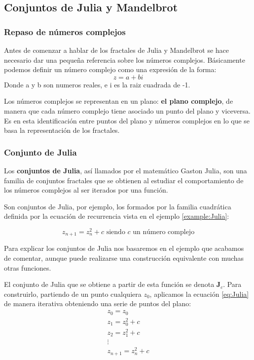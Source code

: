 \subsection{Conjuntos de Julia y Mandelbrot}

\subsubsection{Repaso de números complejos}
Antes de comenzar a hablar de los fractales de Julia y Mandelbrot se hace necesario dar una pequeña referencia sobre los números complejos. Básicamente podemos definir un número complejo como una expresión de la forma:
\[z=a +bi\]
Donde a y b son numeros reales, e i es la raiz cuadrada de -1.

Los números complejos se representan en un plano: \textbf{el plano complejo}, de manera que cada número complejo tiene asociado un punto del plano y viceversa. Es en esta identificación entre puntos del plano y números complejos en lo que se basa la representación de los fractales.

\subsubsection{Conjunto de Julia}
\begin{definition}
Los \textbf{conjuntos de Julia}, así llamados por el matemático Gaston Julia, son una familia de conjuntos fractales que se obtienen al estudiar el comportamiento de los números complejos al ser iterados por una función.

Son conjuntos de Julia, por ejemplo, los formados por la familia cuadrática definida por la ecuación de recurrencia vista en el ejemplo \ref{example:Julia}:

\begin{equation}
z_{n+1} = z_n^2+c \text{ siendo } c \text{ un número complejo}
\end{equation}\label{eq:Julia}

\end{definition}

Para explicar los conjuntos de Julia nos basaremos en el ejemplo que acabamos de comentar, aunque puede realizarse una construcción equivalente con muchas otras funciones.

El conjunto de Julia que se obtiene a partir de esta función se denota \textbf{J$_c$}. Para construirlo, partiendo de un punto cualquiera $z_0$, aplicamos la ecuación \ref{eq:Julia} de manera iterativa obteniendo una serie de puntos del plano:
\[\begin{array}{l}
z_0=z_0\\
z_1=z_0^2+c \\
z_2 = z_1^2 + c \\
\vdots \\
z_{n+1} = z_n^2+c
\end{array}\]

